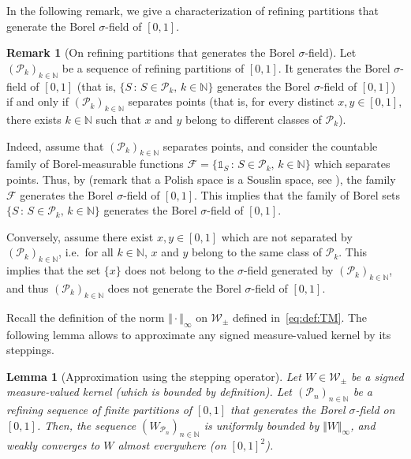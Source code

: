 \documentclass{amsart}
\newcommand{\ie}{i.e.\ }
\theoremstyle{plain}
\newtheorem{lemme}[Th]{Lemma}
\theoremstyle{definition}
\newtheorem{remark}[Th]{Remark}
\newcommand{\signed}{\pm}
\newcommand{\cP}{\mathcal{P}}
\newcommand{\Kernel}{\mathcal{W}_{\signed}}
\newcommand{\TM}[1]{\norm{#1}_\infty}
\newcommand{\F}{\mathcal{F}}
\newcommand{\ind}{\mathds{1}}
\newcommand{\N}{\mathbb{N}}
\newcommand{\norm}[1]{\Vert#1\Vert}
\begin{document}
In the following remark, we give a characterization of refining partitions
	that generate the  Borel  $\sigma$-field of $[0,1]$.
\begin{remark}[On refining partitions that generates the Borel $\sigma$-field]
	\label{rem_refining_partitions}
  Let  $(\cP_{k})_{k\in\N}$ be  a sequence  of refining  partitions of
  $[0, 1]$. 
  It  generates   the  Borel
  $\sigma$-field of $[0,1]$ (that is, $\{  S   \,  :  \,   S\in\cP_k,\,  k\in\N  \}$  
  generates   the  Borel $\sigma$-field of $[0,1]$)   
  if and only if  $(\cP_{k})_{k\in\N}$  separates points (that is,   
  for every  distinct $x,y\in [0,1]$, there exists  $k\in\N$  
  such  that  $x$  and  $y$ belong  to  different  classes  of $\cP_k$). 
	
  Indeed, assume that  $(\cP_{k})_{k\in\N}$ separates points,
  and consider   the   countable   family  of   Borel-measurable   functions
  $\F  = \{  \ind_S  \, :  \, S\in\cP_k,\,  k\in\N  \}$ which  separates
  points.   Thus, by  \cite[Theorem~6.8.9]{BogachevMT2}  (remark that  a
  Polish       space      is       a       Souslin      space,       see
  \cite[Definition~6.6.1]{BogachevMT2}), the  family $\F$  generates the
  Borel  $\sigma$-field of  $[0,1]$.  This  implies that  the family  of
  Borel sets $\{  S \, : \, S\in\cP_k,\, k\in\N  \}$ generates the Borel
  $\sigma$-field of $[0,1]$.
  
  Conversely, assume there exist $x,y\in [0,1]$
  which are not separated by $(\cP_{k})_{k\in\N}$,
  \ie for all $k\in \N$, $x$ and $y$ belong to the same class of $\cP_k$.
  This implies that the set $\{x\}$ does not belong to the $\sigma$-field generated
  by $(\cP_{k})_{k\in\N}$, and thus $(\cP_{k})_{k\in\N}$ does not
  generate   the  Borel $\sigma$-field of $[0,1]$.
\end{remark}





Recall the definition of the norm  $\TM{\cdot}$ on $\Kernel$ defined in~\eqref{eq:def:TM}. 
The following lemma allows to approximate any signed measure-valued kernel
	by its steppings.

\begin{lemme}[Approximation using the stepping operator]
\label{lem:approx-W-p}
Let $W\in \Kernel$ be a signed measure-valued kernel
 (which is bounded by definition). 
Let  $(\mathcal{P}_n  )_{n\in\N}$  be  a  refining sequence  of   finite
partitions  of  $[0,1]$  that  generates the Borel $\sigma$-field on $[0,1]$.   
Then,  the  sequence $(W_{\mathcal{P}_n}  )_{n\in\N}$  
is uniformly  bounded by  $\TM{W}$, and
weakly converges to $W$ almost everywhere (on $[0,1]^2$).
\end{lemme}
\end{document}
